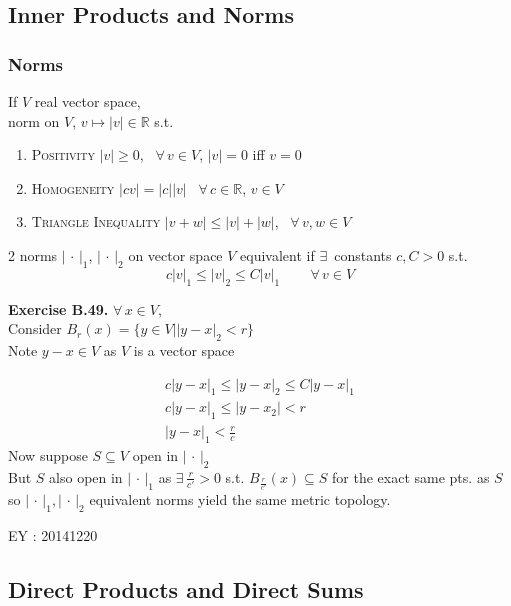 \documentclass[11pt]{amsart}
\theoremstyle{definition}
\newcommand{\exercisehead}[1]{\medskip\noindent\textbf{Exercise #1.} }
\begin{document}
\subsection*{Inner Products and Norms}


\subsubsection*{Norms}

If $V$ real vector space, \\
\phantom{\quad } norm on $V$, $v \mapsto |v| \in \mathbb{R}$ s.t.
\begin{enumerate}
\item[(i)] \textsc{Positivity} $|v| \geq 0$, \, $\forall \, v \in V$, $|v| =0$ iff $v=0$
\item[(ii)] \textsc{Homogeneity} $|cv| = |c| |v|$ \quad \, $\forall \, c \in \mathbb{R}$, $v\in V$
\item[(iii)] \textsc{Triangle Inequality} $|v+w | \leq |v| + |w|$, \, $\forall \, v,w \in V$
\end{enumerate}

2 norms $| \, \cdot \, |_1$, $| \, \cdot \, |_2$ on vector space $V$ equivalent if $\exists \, $ constants $c,C >0$ s.t.
\[
c|v|_1 \leq |v|_2 \leq C|v|_1 \quad \quad \, \forall \, v \in V
\]

\exercisehead{B.49} $\forall \, x \in V$, \\
Consider $B_r(x) = \{ y \in V | |y-x|_2 < r \}$ \\
\phantom{ \quad } Note $y-x \in V$ as $V$ is a vector space

\[
\begin{gathered}
  c|y-x|_1 \leq |y-x|_2 \leq C |y-x|_1 \\
 c|y-x|_1 \leq |y-x_2| < r \\
 |y-x|_1 < \frac{r}{c}
\end{gathered}
\]
Now suppose $S \subseteq V$ open in $| \, \cdot \, |_2$ \\
\phantom{ \quad } But $S$ also open in $| \, \cdot \, |_1$ as $\exists \, \frac{r}{c'} >0$ s.t. $B_{\frac{r}{c'}}(x) \subseteq S$ for the exact same pts. as $S$ \\
so $| \, \cdot \, |_1, | \, \cdot \, |_2$ equivalent norms yield the same metric topology.

EY : 20141220



\subsection*{Direct Products and Direct Sums}




\end{document}
